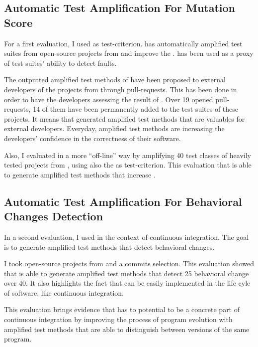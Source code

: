 \subsection{Automatic Test Amplification For Mutation Score}
\label{subsec:conclusion:contributions-summary:test-ampl-ms}

For a first evaluation, I used \ms as test-criterion.
\dspot has automatically amplified test suites from open-source projects from \gh and improve the \ms.
\ms has been used as a proxy of test suites' ability to detect faults.

The outputted amplified test methods of \dspot have been proposed to external developers of the projects from \gh through pull-requests.
This has been done in order to have the developers assessing the result of \dspot.
Over 19 opened pull-requests, 14 of them have been permanently added to the test suites of these projects.
It means that \dspot generated amplified test methods that are valuables for external developers.
Everyday, amplified test methods are increasing the developers' confidence in the correctness of their software.

Also, I evaluated \dspot in a more ``off-line'' way by amplifying 40 test classes of heavily tested projects from \gh, using also the \ms as test-criterion.
This evaluation that \dspot is able to generate amplified test methods that increase \ms.

\subsection{Automatic Test Amplification For Behavioral Changes Detection}
\label{subsec:conclusion:contributions-summary:behavioral-change-detection}

In a second evaluation, I used \dspot in the context of continuous integration.
The goal is to generate amplified test methods that detect behavioral changes.

I took open-source projects from \gh and a commits selection.
This evaluation showed that \dspot is able to generate amplified test methods that detect 25 behavioral change over 40.
It also highlights the fact that \dspot can be easily implemented in the life cyle of software, like continuous integration.

This evaluation brings evidence that \dspot has to potential to be a concrete part of continuous integration by improving the process of program evolution with amplified test methods that are able to distinguish between versions of the same program.

